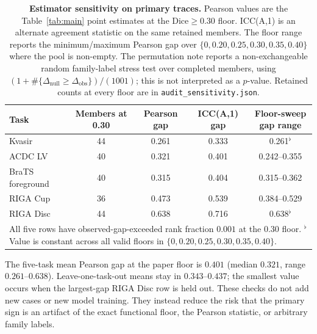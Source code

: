 \begin{table}[!htbp]
  \caption{\textbf{Estimator sensitivity on primary traces.} Pearson values are the
  Table~\ref{tab:main} point estimates at the Dice${\geq}0.30$ floor. ICC(A,1)
  is an alternate agreement statistic on the same retained members. The floor
  range reports the minimum/maximum Pearson gap over
  $\{0,0.20,0.25,0.30,0.35,0.40\}$ where the pool is non-empty. The permutation
  note reports a non-exchangeable random family-label stress test over completed
  members, using
  $(1+\#\{\Delta_{\mathrm{null}}\geq\Delta_{\mathrm{obs}}\})/(1001)$; this is not
  interpreted as a $p$-value. Retained counts at every floor are in
  \texttt{audit\_sensitivity.json}.}
  \label{tab:audit-sensitivity}
  \centering\footnotesize
  \begin{tabular}{lcccc}
    \toprule
    Task & Members at 0.30 & Pearson gap & ICC(A,1) gap & Floor-sweep gap range \\
    \midrule
    Kvasir    & 44 & 0.261 & 0.333 & 0.261$^{\flat}$ \\
    ACDC LV   & 40 & 0.321 & 0.401 & 0.242--0.355 \\
    BraTS foreground & 40 & 0.315 & 0.404 & 0.315--0.362 \\
    RIGA Cup  & 36 & 0.473 & 0.539 & 0.384--0.529 \\
    RIGA Disc & 44 & 0.638 & 0.716 & 0.638$^{\flat}$ \\
    \bottomrule
    \multicolumn{5}{p{0.84\linewidth}}{\footnotesize All five rows have observed-gap-exceeded
    rank fraction $0.001$ at the 0.30 floor. $^{\flat}$ Value is constant across all valid floors in $\{0,0.20,0.25,0.30,0.35,0.40\}$.} \\
  \end{tabular}
\end{table}

The five-task mean Pearson gap at the paper floor is $0.401$ (median $0.321$,
range $0.261$--$0.638$). Leave-one-task-out means stay in
$0.343$--$0.437$; the smallest value occurs when the largest-gap RIGA Disc row
is held out. These checks do not add new cases or new model training. They
instead reduce the risk that the primary sign is an artifact of the exact
functional floor, the Pearson statistic, or arbitrary family labels.

